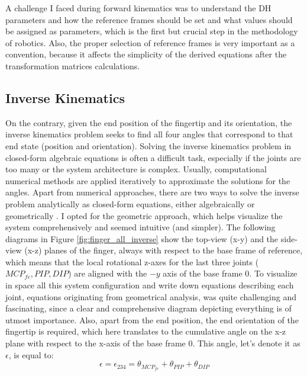 \documentclass[a4paper,12pt]{article}
\begin{document}
A challenge I faced during forward kinematics was to understand the DH parameters and how the reference frames should be set and what values should be assigned as parameters, which is the first but crucial step in the methodology of robotics. Also, the proper selection of reference frames is very important as a convention, because it affects the simplicity of the derived equations after the transformation matrices calculations.


\subsection{Inverse Kinematics}
On the contrary, given the end position of the fingertip and its orientation, the inverse kinematics problem seeks to find all four angles that correspond to that end state (position and orientation). Solving the inverse kinematics problem in closed-form algebraic equations is often a difficult task, especially if the joints are too many or the system architecture is complex. Usually, computational numerical methods are applied iteratively to approximate the solutions for the angles. Apart from numerical approaches, there are two ways to solve the inverse problem analytically as closed-form equations, either algebraically or geometrically \cite{craig2009introduction, CheckValidAngles_BEST_chen2013constraint, BEST_li2022kinematic, chavdarov2022algorithm, nunez2015design}. I opted for the geometric approach, which helps visualize the system comprehensively and seemed intuitive (and simpler). The following diagrams in Figure \ref{fig:finger_all_inverse} show the top-view (x-y) and the side-view (x-z) planes of the finger, always with respect to the base frame of reference, which means that the local rotational z-axes for the last three joints ($MCP_{fe}, PIP, DIP$) are aligned with the $-y$ axis of the base frame 0. To visualize in space all this system configuration and write down equations describing each joint, equations originating from geometrical analysis, was quite challenging and fascinating, since a clear and comprehensive diagram depicting everything is of utmost importance. Also, apart from the end position, the end orientation of the fingertip is required, which here translates to the cumulative angle on the x-z plane with respect to the x-axis of the base frame 0. This angle, let's denote it as $\epsilon$, is equal to:\\
\begin{equation}
    \epsilon = \epsilon_{234} = \theta_{MCP_{fe}} + \theta_{PIP} + \theta_{DIP}
\end{equation}
\end{document}
